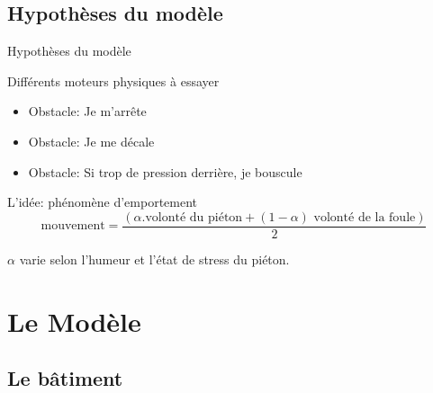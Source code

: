 \documentclass[11pt]{beamer}
\begin{document}
    \subsection{Hypothèses du modèle}
    
\begin{frame}{Hypothèses du modèle}
\begin{block}{Différents moteurs physiques à essayer}
\begin{itemize}
\item Obstacle: Je m'arrête
\item Obstacle: Je me décale
\item Obstacle: Si trop de pression derrière, je bouscule
\end{itemize}
\end{block}

\begin{block}{L'idée: phénomène d'emportement}
$$\textrm{mouvement} = \frac{( \alpha . \textrm{volonté du piéton} + (1-\alpha) \textrm{ volonté de la foule} )}{2}$$
\vspace{0.5cm}
\end{block}
$\alpha$ varie selon l'humeur et l'état de stress du piéton.
\end{frame}

\section{Le Modèle}
    \subsection{Le bâtiment}
\end{document}
